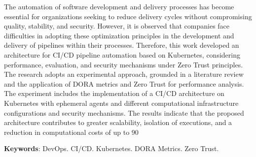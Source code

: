 The automation of software development and delivery processes has become essential for organizations seeking to reduce delivery cycles without compromising quality, stability, and security. However, it is observed that companies face difficulties in adopting these optimization principles in the development and delivery of pipelines within their processes. Therefore, this work developed an architecture for CI/CD pipeline automation based on Kubernetes, considering performance, evaluation, and security mechanisms under Zero Trust principles. The research adopts an experimental approach, grounded in a literature review and the application of DORA metrics and Zero Trust for performance analysis. The experiment includes the implementation of a CI/CD architecture on Kubernetes with ephemeral agents and different computational infrastructure configurations and security mechanisms.
The results indicate that the proposed architecture contributes to greater scalability, isolation of executions, and a reduction in computational costs of up to 90%

\textbf{Keywords}: DevOps. CI/CD. Kubernetes. DORA Metrics. Zero Trust.